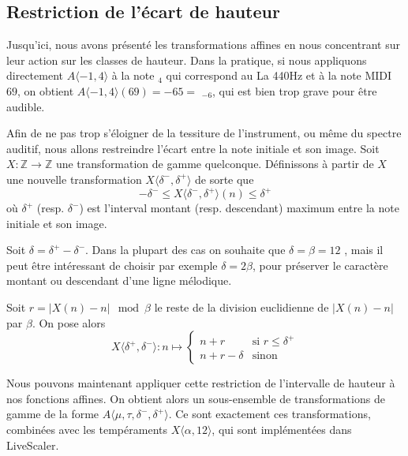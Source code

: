 \subsection{Restriction de l'écart de hauteur}
Jusqu'ici, nous avons présenté les transformations affines en nous concentrant sur leur action sur les classes de hauteur. Dans la pratique, si nous appliquons directement $A\langle -1,4 \rangle$ à la note  $_4$ qui correspond au La 440Hz et à la note MIDI $69$, on obtient $A\langle -1,4 \rangle(69)  = -65 =$ $_{-6}$, qui est bien trop grave pour être audible. 

Afin de ne pas trop s'éloigner de la tessiture de l'instrument, ou même du spectre auditif, nous allons restreindre l'écart entre la note initiale et son image. Soit $X : \mathbb{Z}\rightarrow \mathbb{Z}$ une transformation de gamme quelconque. Définissons à partir de $X$ une nouvelle transformation $X\langle \delta^-, \delta^+\rangle$ de sorte que $$ - \delta^- \leq X\langle \delta^-, \delta^+\rangle(n) \leq \delta ^+$$ \noindent où $\delta^+$ (resp. $\delta^-$) est l'interval montant (resp. descendant) maximum entre la note initiale et son image.

Soit $\delta = \delta^+ - \delta^-$.  Dans la plupart des cas on souhaite que $\delta = \beta = 12$ , mais il peut être intéressant de choisir par exemple $\delta  = 2\beta$, pour préserver le caractère montant ou descendant d'une ligne mélodique.

Soit $r = |X(n) - n | \mod \beta$ le reste de la division euclidienne de  $|X(n) - n |$ par $\beta$. On pose alors 
$$
X\langle \delta^+, \delta^- \rangle : n \mapsto \begin{cases}
  n + r & \text{si $r \leq \delta^+$}\\
  n + r - \delta & \text{sinon}
\end{cases}
$$

Nous pouvons maintenant appliquer cette restriction de l'intervalle de hauteur à nos fonctions affines. On obtient alors un sous-ensemble de transformations de gamme de la forme $A\langle \mu, \tau, \delta^-, \delta^+\rangle$. Ce sont exactement ces transformations, combinées avec les tempéraments $X\langle \alpha,12\rangle$, qui sont implémentées dans LiveScaler.
  

